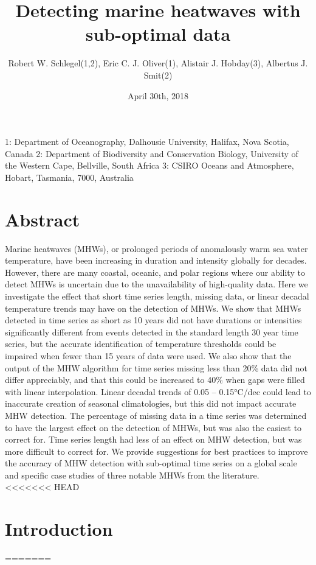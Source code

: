 \documentclass[]{article}
\title{Detecting marine heatwaves with sub-optimal data}
\author{Robert W. Schlegel(1,2), Eric C. J. Oliver(1), Alistair J. Hobday(3),
Albertus J. Smit(2)}
\date{April 30th, 2018}
\begin{document}
\maketitle

1: Department of Oceanography, Dalhousie University, Halifax, Nova
Scotia, Canada 2: Department of Biodiversity and Conservation Biology,
University of the Western Cape, Bellville, South Africa 3: CSIRO Oceans
and Atmosphere, Hobart, Tasmania, 7000, Australia

\section{Abstract}\label{abstract}

Marine heatwaves (MHWs), or prolonged periods of anomalously warm sea
water temperature, have been increasing in duration and intensity
globally for decades. However, there are many coastal, oceanic, and
polar regions where our ability to detect MHWs is uncertain due to the
unavailability of high-quality data. Here we investigate the effect that
short time series length, missing data, or linear decadal temperature
trends may have on the detection of MHWs. We show that MHWs detected in
time series as short as 10 years did not have durations or intensities
significantly different from events detected in the standard length 30
year time series, but the accurate identification of temperature
thresholds could be impaired when fewer than 15 years of data were used.
We also show that the output of the MHW algorithm for time series
missing less than 20\% data did not differ appreciably, and that this
could be increased to 40\% when gaps were filled with linear
interpolation. Linear decadal trends of 0.05 -- 0.15°C/dec could lead to
inaccurate creation of seasonal climatologies, but this did not impact
accurate MHW detection. The percentage of missing data in a time series
was determined to have the largest effect on the detection of MHWs, but
was also the easiest to correct for. Time series length had less of an
effect on MHW detection, but was more difficult to correct for. We
provide suggestions for best practices to improve the accuracy of MHW
detection with sub-optimal time series on a global scale and specific
case studies of three notable MHWs from the literature.\\

<<<<<<< HEAD
\hypertarget{introduction}{%
\section{Introduction}\label{introduction}}
=======
\end{document}
